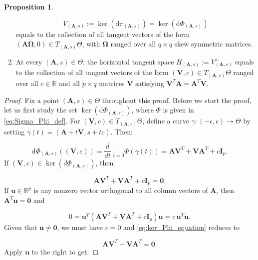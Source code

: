 \documentclass[12pt]{report}
\theoremstyle{plain}
\theoremstyle{definition}
\newtheorem{proposition}[theorem]{Proposition}
\begin{document}
\begin{CJK*}{UTF8}{gbsn}
\begin{proposition}
\begin{enumerate}
  \begin{equation}\label{eq:vertical_space}
  V_{(\bm{A},s)} :=\ker(\mathrm{d}\pi_{(\bm{A},s)}) = \ker(\mathrm{d}\Phi_{(\bm{A},s)})
  \end{equation}
  equals to the collection of all tangent vectors 
of the form $(\bm{A} \bm{\Omega}, 0) \in T_{(\bm{A},s)}\Theta$,
with $\bm{\Omega}$ ranged over all $q \times q$ skew symmetric matrices.
  \item At every $(\bm{A},s) \in \Theta$,
  the horizontal tangent space $H_{(\bm{A},s)} := V_{(\bm{A},s)}^{\perp}$
equals to the collection of all tangent vectors 
of the form $(\bm{V}, c) \in T_{(\bm{A},s)}\Theta$
ranged over all $c \in \mathbb{R}$ and all 
$p \times q$ matrices $\bm{V}$
satisfying $\bm{V}^T \bm{A} = \bm{A}^T \bm{V}$.
\end{enumerate}
\end{proposition}

\begin{proof}
Fix a point $(\bm{A},s) \in \Theta$
throughout this proof.
Before we start the proof,
let us first study the set $\ker(\mathrm{d}\Phi_{(\bm{A},s)})$,
where $\Phi$ is given in \eqref{eq:Sigma_Phi_def}.
For $(\bm{V}, c) \in T_{(\bm{A},s)}\Theta$, 
define a curve $\gamma : (-\epsilon, \epsilon) \to \Theta$
by setting $\gamma(t) = (\bm{A}+t\bm{V}, s + tc)$.
Then:

\begin{equation*}
  \mathrm{d} \Phi_{(\bm{A},s)} ((\bm{V}, c)) = 
  \frac{d}{dt} \bigg|_{t = 0} \Phi(\gamma(t)) = \bm{A}\bm{V}^T + \bm{V} \bm{A}^T + c\bm{I}_p.
\end{equation*}
If $(\bm{V}, c) \in \ker(d\Phi_{(\bm{A},s)})$,
then

\begin{equation}\label{eq:ker_Phi_equation}
  \bm{A}\bm{V}^T + \bm{V} \bm{A}^T + c\bm{I}_p = \bm{0}.
\end{equation}
If $\bm{u} \in \mathbb{R}^p$ is any nonzero vector orthogonal to
all column vectors of $\bm{A}$, then $\bm{A}^T \bm{u} = \bm{0}$ and

\begin{equation*}
  0 = \bm{u}^T (\bm{A}\bm{V}^T + \bm{V} \bm{A}^T + c\bm{I}_p) \bm{u}
  = c \, \bm{u}^T \bm{u}.
\end{equation*}
Given that $\bm{u} \neq \bm{0}$, we must have $c = 0$
and \eqref{eq:ker_Phi_equation} reduces to

\begin{equation}\label{eq:ker_Phi_equation_reduced}
  \bm{A}\bm{V}^T + \bm{V} \bm{A}^T = \bm{0}.
\end{equation}
Apply $\bm{u}$ to the right to get:


\end{proof}
\end{CJK*}
\end{document}
